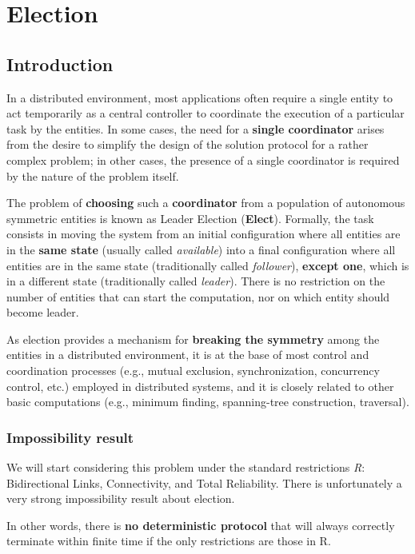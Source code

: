 \section{Election}
\subsection{Introduction}
In a distributed environment, most applications often require a single entity to act temporarily as a central controller to coordinate the execution of a particular task by the entities. In some cases, the need for a \textbf{single coordinator} arises from the desire to simplify the design of the solution protocol for a rather complex problem; in other cases, the presence of a single coordinator is required by the nature of the problem itself. 

The problem of \textbf{choosing} such a \textbf{coordinator} from a population of autonomous symmetric entities is known as Leader Election (\textbf{Elect}). Formally, the task consists in moving the system from an initial configuration where all entities are in the \textbf{same state} (usually called \textit{available}) into a final configuration where all entities are in the same state (traditionally called \textit{follower}), \textbf{except one}, which is in a different state (traditionally called \textit{leader}). There is no restriction on the number of entities that can start the computation, nor on which entity should become leader.

As election provides a mechanism for \textbf{breaking the symmetry} among the entities in a distributed environment, it is at the base of most control and coordination processes (e.g., mutual exclusion, synchronization, concurrency control, etc.) employed in distributed systems, and it is closely related to other basic computations (e.g., minimum finding, spanning-tree construction, traversal).

\subsubsection{Impossibility result}
We will start considering this problem under the standard restrictions \textit{R}: Bidirectional Links, Connectivity, and Total Reliability. There is unfortunately a very strong impossibility result about election.


In other words, there is \textbf{no deterministic protocol} that will always correctly terminate within finite time if the only restrictions are those in R. 

